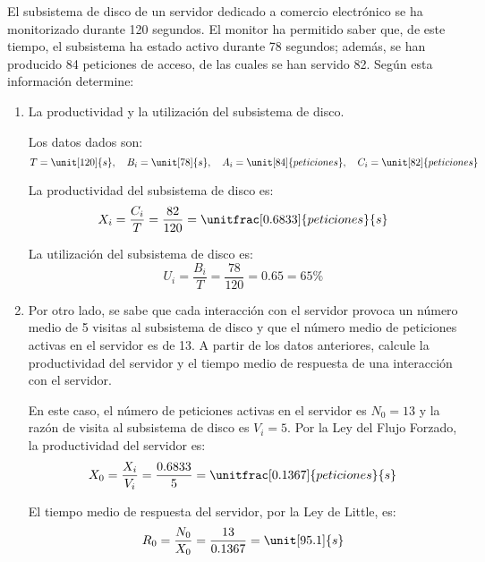 \begin{ejercicio}\label{ej:5.6}
    El subsistema de disco de un servidor dedicado a comercio electrónico se ha monitorizado durante 120 segundos. El monitor ha permitido saber que, de este tiempo, el subsistema ha estado activo durante 78 segundos; además, se han producido 84 peticiones de acceso, de las cuales se han servido 82. Según esta información determine:
    \begin{enumerate}
        \item La productividad y la utilización del subsistema de disco.
        
        Los datos dados son:
        \begin{equation*}
            T = \unit[120]{s}, \quad B_i = \unit[78]{s}, \quad A_i = \unit[84]{peticiones}, \quad C_i = \unit[82]{peticiones}
        \end{equation*}

        La productividad del subsistema de disco es:
        \begin{equation*}
            X_i = \dfrac{C_i}{T} = \dfrac{82}{120} = \unitfrac[0.6833]{peticiones}{s}
        \end{equation*}

        La utilización del subsistema de disco es:
        \begin{equation*}
            U_i = \dfrac{B_i}{T} = \dfrac{78}{120} = 0.65 = 65\%
        \end{equation*}
        \item Por otro lado, se sabe que cada interacción con el servidor provoca un número medio de 5 visitas al subsistema de disco y que el número medio de peticiones activas en el servidor es de 13. A partir de los datos anteriores, calcule la productividad del servidor y el tiempo medio de respuesta de una interacción con el servidor.
        
        En este caso, el número de peticiones activas en el servidor es $N_0 = 13$ y la razón de visita al subsistema de disco es $V_i = 5$. Por la Ley del Flujo Forzado, la productividad del servidor es:
        \begin{equation*}
            X_0 = \dfrac{X_i}{V_i} = \dfrac{0.6833}{5} = \unitfrac[0.1367]{peticiones}{s}
        \end{equation*}

        El tiempo medio de respuesta del servidor, por la Ley de Little, es:
        \begin{equation*}
            R_0 = \dfrac{N_0}{X_0} = \dfrac{13}{0.1367} = \unit[95.1]{s}
        \end{equation*}        
    \end{enumerate}
\end{ejercicio}
